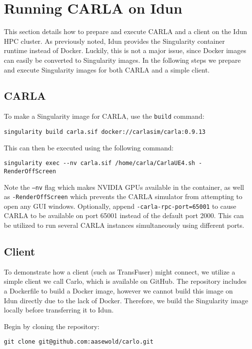 \section{Running CARLA on Idun}
\label{app:instructions:idun}

This section details how to prepare and execute CARLA and a client on the Idun HPC cluster.
As previously noted,
Idun provides the Singularity container runtime instead of Docker.
Luckily, this is not a major issue,
since Docker images can easily be converted to Singularity images.
In the following steps we prepare and execute Singularity images for both CARLA and a simple client.


\subsection{CARLA}

To make a Singularity image for CARLA,
use the \texttt{build} command:
\begin{lstlisting}
singularity build carla.sif docker://carlasim/carla:0.9.13
\end{lstlisting}

This can then be executed using the following command:
\begin{lstlisting}
singularity exec --nv carla.sif /home/carla/CarlaUE4.sh -RenderOffScreen
\end{lstlisting}
Note the \texttt{--nv} flag which makes NVIDIA GPUs available in the container,
as well as \texttt{-RenderOffScreen} which prevents the CARLA simulator from attempting to open any GUI windows.
Optionally,
append \texttt{-carla-rpc-port=65001}
to cause CARLA to be available on port 65001 instead of the default port 2000.
This can be utilized to run several CARLA instances simultaneously using different ports.


\subsection{Client}

To demonstrate how a client (such as TransFuser) might connect,
we utilize a simple client we call Carlo, which is available on GitHub.
The repository includes a Dockerfile to build a Docker image,
however we cannot build this image on Idun directly due to the lack of Docker.
Therefore, we build the Singularity image locally
before transferring it to Idun.

Begin by cloning the repository:
\begin{lstlisting}
git clone git@github.com:aasewold/carlo.git
\end{lstlisting}

